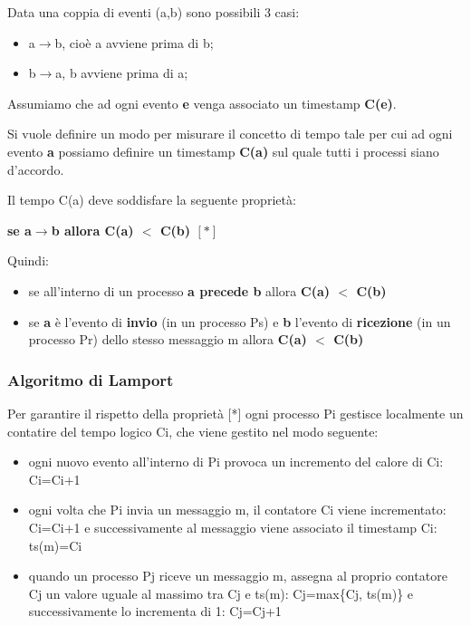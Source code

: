 \documentclass{article}
\begin{document}
\vspace{3mm}
Data una coppia di eventi (a,b) sono possibili 3 casi:
\begin{itemize}
    \item a$\rightarrow$b, cioè a avviene prima di b;
    \item b$\rightarrow$a, b avviene prima di a;
\end{itemize}

\vspace{5mm}
Assumiamo che ad ogni evento \textbf{e} venga associato un timestamp \textbf{C(e)}.

Si vuole definire un modo per misurare il concetto di tempo tale per cui ad ogni evento \textbf{a} possiamo definire un timestamp \textbf{C(a)} sul quale tutti i processi
siano d'accordo.

Il tempo C(a) deve soddisfare la seguente proprietà:

\begin{center}
    \textbf{se a$\rightarrow$b allora C(a) $<$ C(b) $[*]$}
\end{center}

\vspace{3mm}
Quindi:
\begin{itemize}
    \item se all'interno di un processo \textbf{a precede b} allora \textbf{C(a) $<$ C(b)}
    \item se \textbf{a} è l'evento di \textbf{invio} (in un processo Ps) e \textbf{b} l'evento di \textbf{ricezione} (in un processo Pr) dello stesso messaggio m allora \textbf{C(a) $<$ C(b)}
\end{itemize}

\subsubsection{Algoritmo di Lamport}
Per garantire il rispetto della proprietà [*] ogni processo Pi gestisce localmente un contatire del tempo logico Ci, che viene gestito nel modo seguente:
\begin{itemize}
    \item ogni nuovo evento all'interno di Pi provoca un incremento del calore di Ci: Ci=Ci+1
    \item ogni volta che Pi invia un messaggio m, il contatore Ci viene incrementato: Ci=Ci+1 e successivamente al messaggio viene associato il timestamp Ci: ts(m)=Ci
    \item quando un processo Pj riceve un messaggio m, assegna al proprio contatore Cj un valore uguale al massimo tra Cj e ts(m): Cj=max\{Cj, ts(m)\} e successivamente lo incrementa di 1: Cj=Cj+1
\end{itemize}
\end{document}
